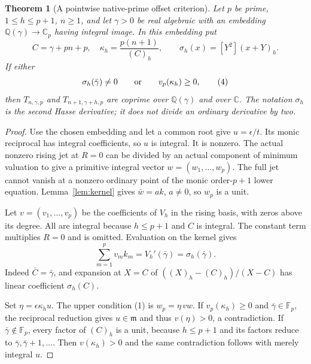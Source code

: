 \documentclass[11pt]{article}
\newtheorem{theorem}[lemma]{Theorem}
\begin{document}
\begin{theorem}[A pointwise native-prime offset criterion]
\label{thm:criterion}
Let $p$ be prime, $1\le h\le p+1$, $n\ge1$, and let $\gamma>0$
be real algebraic with an embedding
$\mathbb Q(\gamma)\longrightarrow\mathbb C_p$ having integral image.
In this embedding put
\[
 C=\gamma+pn+p,\quad \kappa_h=\frac{p(n+1)}{(C)_h},\qquad
 \sigma_h(x)=[Y^2](x+Y)_h .
\]
If either
\[
 \sigma_h(\bar\gamma)\ne0
 \qquad\hbox{or}\qquad v_p(\kappa_h)\ge0,                 \tag{4}
\]
then $T_{n,\gamma,p}$ and $T_{n+1,\gamma+h,p}$ are coprime over
$\mathbb Q(\gamma)$ and over $\mathbb C$.
The notation $\sigma_h$ is the second Hasse derivative; it does
not divide an ordinary derivative by two.
\end{theorem}
\begin{proof}
Use the chosen embedding and let a common root give
$u=\epsilon/t$. Its monic reciprocal has integral coefficients,
so $u$ is integral. It is nonzero.
The actual nonzero rising jet at $R=0$ can be divided by an actual
component of minimum valuation to give a primitive integral vector
$w=(w_1,\ldots,w_p)$.
The full jet cannot vanish at a nonzero ordinary point of the
monic order-$p+1$ lower equation.
Lemma~\ref{lem:kernel} gives $\bar w=a k$, $a\ne0$, so $w_p$ is a unit.

Let $v=(v_1,\ldots,v_p)$ be the coefficients of $V_h$ in the rising
basis, with zeros above its degree. All are integral because
$h\le p+1$ and $C$ is integral.
The constant term multiplies $R=0$ and is omitted.
Evaluation on the kernel gives
\[
 \sum_{m=1}^pv_m k_m=V_h'(\bar\gamma)=\sigma_h(\bar\gamma).
                                                               \tag{5}
\]
Indeed $\bar C=\bar\gamma$, and expansion at $X=C$ of
$((X)_h-(C)_h)/(X-C)$ has linear coefficient $\sigma_h(C)$.

Set $\eta=\epsilon\kappa_hu$. The upper condition (1) is
$w_p=\eta\,v w$.
If $v_p(\kappa_h)\ge0$ and $\bar\gamma\in\mathbb F_p$,
the reciprocal reduction gives $u\in\mathfrak m$ and thus
$v(\eta)>0$, a contradiction.
If $\bar\gamma\notin\mathbb F_p$, every factor of $(C)_h$
is a unit, because $h\le p+1$ and its factors reduce to
$\bar\gamma,\bar\gamma+1,\ldots$.
Then $v(\kappa_h)>0$ and the same contradiction follows
with merely integral $u$.


\end{proof}
\end{document}

